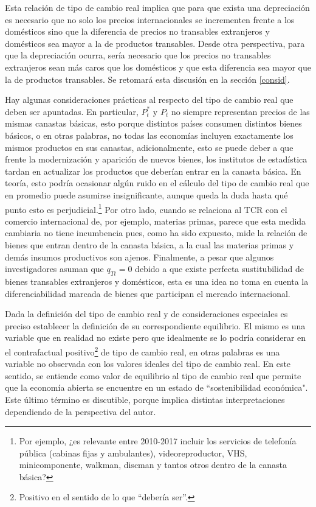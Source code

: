 \documentclass[12pt,letterpaper]{article}
\begin{document}
Esta relación de tipo de cambio real implica que para que exista una depreciación es necesario que no solo los precios internacionales se incrementen frente a los domésticos sino que la diferencia de precios no transables extranjeros y domésticos sea mayor a la de productos transables. Desde otra perspectiva, para que la depreciación ocurra, sería necesario que los precios no transables extranjeros sean más caros que los domésticos y que esta diferencia sea mayor que la de productos transables. Se retomará esta discusión en la sección \ref{consid}.

Hay algunas consideraciones prácticas al respecto del tipo de cambio real que deben ser apuntadas. En particular, $P_t^*$ y $P_t$ no siempre representan precios de las mismas canastas básicas, esto porque distintos países consumen distintos bienes básicos, o en otras palabras, no todas las economías incluyen exactamente los mismos productos en sus canastas, adicionalmente, esto se puede deber a que frente la modernización y aparición de nuevos bienes, los institutos de estadística tardan en actualizar los productos que deberían entrar en la canasta básica. En teoría, esto podría ocasionar algún ruido en el cálculo del tipo de cambio real que en promedio puede asumirse insignificante, aunque queda la duda hasta qué punto esto es perjudicial.\footnote{Por ejemplo, ¿es relevante entre 2010-2017 incluir los servicios de telefonía pública (cabinas fijas y ambulantes), videoreproductor, VHS, minicomponente, walkman, discman y tantos otros dentro de la canasta básica?} Por otro lado, cuando se relaciona al TCR con el comercio internacional de, por ejemplo, materias primas, parece que esta medida cambiaria no tiene incumbencia pues, como ha sido expuesto, mide la relación de bienes que entran dentro de la canasta básica, a la cual las materias primas y demás insumos productivos son ajenos. Finalmente, a pesar que algunos investigadores asuman que $q_{Tt}=0$ debido a que existe perfecta sustitubilidad de bienes transables extranjeros y domésticos, esta es una idea no toma en cuenta la diferenciabilidad marcada de bienes que participan el mercado internacional. %

Dada la definición del tipo de cambio real y de consideraciones especiales es preciso establecer la definición de su correspondiente equilibrio. El mismo es una variable que en realidad no existe pero que idealmente se lo podría considerar en el contrafactual positivo\footnote{Positivo en el sentido de lo que ``debería ser''.} de tipo de cambio real, en otras palabras es una variable no observada con los valores ideales del tipo de cambio real. En este sentido, se entiende como valor de equilibrio al tipo de cambio real que permite que la economía abierta se encuentre en un estado de ``sostenibilidad económica". Este último término es discutible, porque implica distintas interpretaciones dependiendo de la perspectiva del autor.
\end{document}
